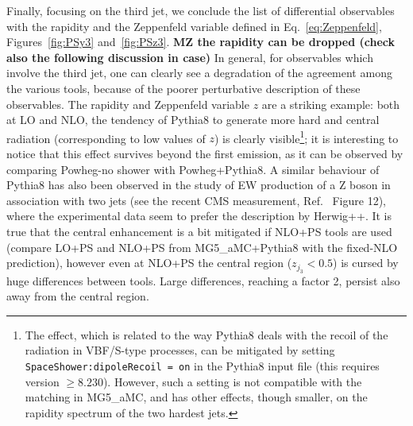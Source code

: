 Finally, focusing on the third jet, we conclude the list of differential observables with the rapidity and the Zeppenfeld variable defined in Eq.~\eqref{eq:Zeppenfeld}, Figures~\ref{fig:PSy3} and~\ref{fig:PSz3}.
{\bf MZ the rapidity can be dropped (check also the following discussion in case)}
In general, for observables which involve the third jet, one
can clearly see a degradation of the agreement among the various tools, because of the poorer perturbative description of these observables. The rapidity and Zeppenfeld variable $z$
are a striking example: both at LO and NLO, the tendency of {\sc Pythia8} to generate more hard and central radiation (corresponding to low values of $z$)
is clearly visible\footnote{The effect, which is related to the way {\sc Pythia8} deals with the recoil of the radiation in VBF/S-type processes,
can be mitigated by setting {\tt SpaceShower:dipoleRecoil = on} in the {\sc Pythia8} input file (this requires version $\ge8.230$). 
However, such a setting is not compatible with the matching
in {\sc MG5\_aMC}, and has other effects, though smaller, on the rapidity spectrum of the two hardest jets.}; it is interesting to notice that
this effect survives beyond the first emission, as it can be observed by comparing {\sc Powheg-no shower} with {\sc Powheg+Pythia8}. A similar
behaviour of {\sc Pythia8}
has also been observed in the study of EW production of a Z boson in association with two jets (see the recent CMS measurement, 
Ref.~\cite{Sirunyan:2017jej} Figure 12), where the experimental data seem to prefer the description by {\sc Herwig++}. 
It is true that the central enhancement
is a bit mitigated if NLO+PS tools are used (compare LO+PS and NLO+PS from {\sc MG5\_aMC+Pythia8} with the fixed-NLO prediction), however even at NLO+PS the central region
($z_{j_3}<0.5$) is cursed by huge differences between tools. Large differences, reaching a factor 2, persist also away from the central region. \\

